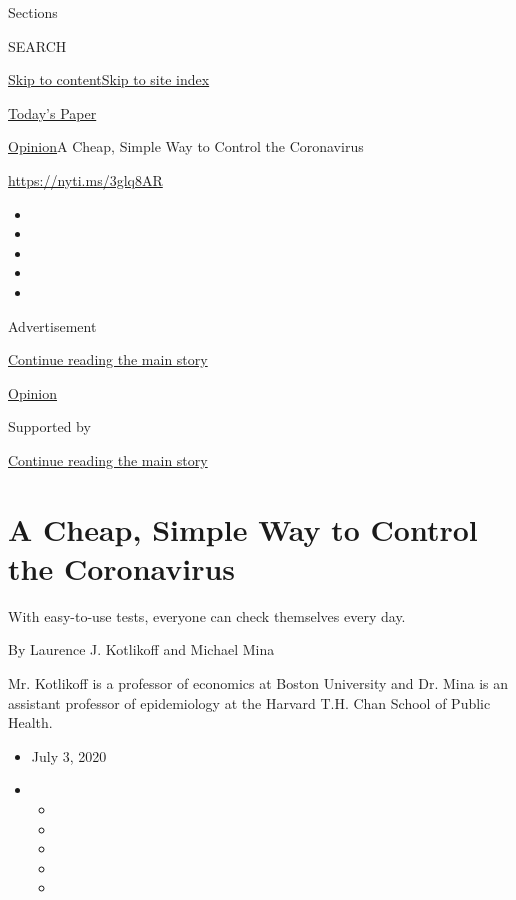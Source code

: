 Sections

SEARCH

\protect\hyperlink{site-content}{Skip to
content}\protect\hyperlink{site-index}{Skip to site index}

\href{https://myaccount.nytimes3xbfgragh.onion/auth/login?response_type=cookie\&client_id=vi}{}

\href{https://www.nytimes3xbfgragh.onion/section/todayspaper}{Today's
Paper}

\href{/section/opinion}{Opinion}\textbar{}A Cheap, Simple Way to Control
the Coronavirus

\url{https://nyti.ms/3glq8AR}

\begin{itemize}
\item
\item
\item
\item
\item
\end{itemize}

Advertisement

\protect\hyperlink{after-top}{Continue reading the main story}

\href{/section/opinion}{Opinion}

Supported by

\protect\hyperlink{after-sponsor}{Continue reading the main story}

\hypertarget{a-cheap-simple-way-to-control-the-coronavirus}{%
\section{A Cheap, Simple Way to Control the
Coronavirus}\label{a-cheap-simple-way-to-control-the-coronavirus}}

With easy-to-use tests, everyone can check themselves every day.

By Laurence J. Kotlikoff and Michael Mina

Mr. Kotlikoff is a professor of economics at Boston University and Dr.
Mina is an assistant professor of epidemiology at the Harvard T.H. Chan
School of Public Health.

\begin{itemize}
\item
  July 3, 2020
\item
  \begin{itemize}
  \item
  \item
  \item
  \item
  \item
  \end{itemize}
\end{itemize}

